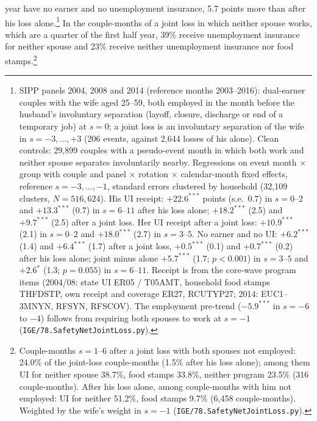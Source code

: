year have no earner and no unemployment insurance, 5.7 points more than after his loss alone.\footnote{SIPP panels
2004, 2008 and 2014 (reference months 2003--2016): dual-earner couples with the wife aged 25--59, both employed in
the month before the husband's involuntary separation (layoff, closure, discharge or end of a temporary job) at
$s = 0$; a joint loss is an involuntary separation of the wife in $s = -3, \dots, +3$ (206 events, against 2{,}644
losses of his alone). Clean controls: 29{,}899 couples with a pseudo-event month in which both work and neither
spouse separates involuntarily nearby. Regressions on event month $\times$ group with couple and panel $\times$
rotation $\times$ calendar-month fixed effects, reference $s = -3, \dots, -1$, standard errors clustered by household
(32{,}109 clusters, $N = 516{,}624$). His UI receipt: $+22.6^{***}$ points (s.e.\ 0.7) in $s = 0$--$2$ and
$+13.3^{***}$ (0.7) in $s = 6$--$11$ after his loss alone; $+18.2^{***}$ (2.5) and $+9.7^{***}$ (2.5) after a joint
loss. Her UI receipt after a joint loss: $+10.9^{***}$ (2.1) in $s = 0$--$2$ and $+18.0^{***}$ (2.7) in $s = 3$--$5$.
No earner and no UI: $+6.2^{***}$ (1.4) and $+6.4^{***}$ (1.7) after a joint loss, $+0.5^{***}$ (0.1) and
$+0.7^{***}$ (0.2) after his loss alone; joint minus alone $+5.7^{***}$ (1.7; $p<0.001$) in $s = 3$--$5$ and
$+2.6^{*}$ (1.3; $p=0.055$) in $s = 6$--$11$. Receipt is from the core-wave program items (2004/08: state UI ER05 /
T05AMT, household food stamps THFDSTP, own receipt and coverage ER27, RCUTYP27; 2014: EUC1--3MNYN, RFSYN, RFSCOV).
The employment pre-trend ($-5.9^{***}$ in $s = -6$ to $-4$) follows from requiring both spouses to work at $s = -1$
(\texttt{IGE/78.SafetyNetJointLoss.py}).} In the couple-months of a joint loss in which neither spouse works, which
are a quarter of the first half year, 39\% receive unemployment insurance for neither spouse and 23\% receive neither
unemployment insurance nor food stamps.\footnote{Couple-months $s = 1$--$6$ after a joint loss with both spouses
not employed: 24.0\% of the joint-loss couple-months (1.5\% after his loss alone); among them UI for neither spouse
38.7\%, food stamps 33.8\%, neither program 23.5\% (316 couple-months). After his loss alone, among couple-months with
him not employed: UI for neither 51.2\%, food stamps 9.7\% (6{,}458 couple-months). Weighted by the wife's weight in
$s = -1$ (\texttt{IGE/78.SafetyNetJointLoss.py}).}

